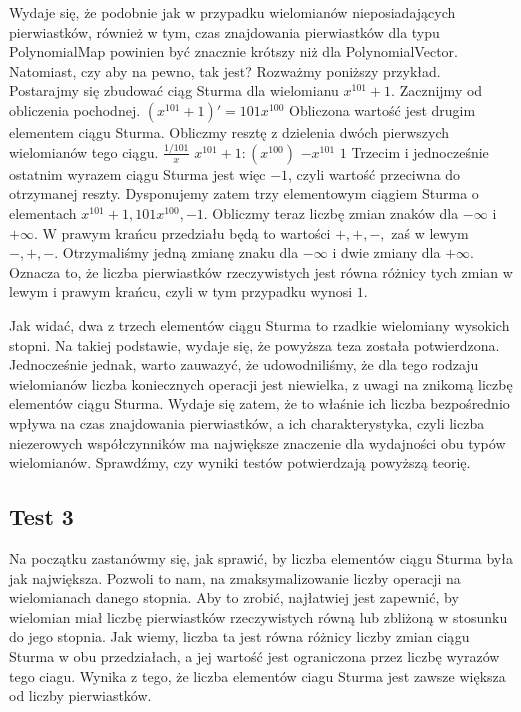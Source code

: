 \documentclass[oneside,a4paper]{book}
\begin{document}
	Wydaje się, że podobnie jak w przypadku wielomianów nieposiadających pierwiastków, również w tym, czas znajdowania pierwiastków dla typu PolynomialMap powinien być znacznie krótszy niż dla PolynomialVector. Natomiast, czy aby na pewno, tak jest? Rozważmy poniższy przykład.
	Postarajmy się zbudować ciąg Sturma dla wielomianu $x^{101}+1$. Zacznijmy od obliczenia pochodnej.
	$(x^{101}+1)'=101x^{100}$
	Obliczona wartość jest drugim elementem ciągu Sturma. Obliczmy resztę z dzielenia dwóch pierwszych wielomianów tego ciągu.
	$\frac{1/101}x$
	$x^{101}+1 : (x^{100})$
	$-x^{101}$
	$1$
	Trzecim i jednocześnie ostatnim wyrazem ciągu Sturma jest więc $-1$, czyli wartość przeciwna do otrzymanej reszty. Dysponujemy zatem trzy elementowym ciągiem Sturma o elementach ${x^{101}+1, 101x^{100}, -1}$. Obliczmy teraz liczbę zmian znaków dla $-\infty$ i $+\infty$. W prawym krańcu przedziału będą to wartości $+,+,-,$ zaś w lewym $-,+,-.$ Otrzymaliśmy jedną zmianę znaku dla $-\infty$ i dwie zmiany dla $+\infty$. Oznacza to, że liczba pierwiastków rzeczywistych jest równa różnicy tych zmian w lewym i prawym krańcu, czyli w tym przypadku wynosi $1$.
	
	Jak widać, dwa z trzech elementów ciągu Sturma to rzadkie wielomiany wysokich stopni. Na takiej podstawie, wydaje się, że powyższa teza została potwierdzona. Jednocześnie jednak, warto zauwazyć, że udowodniliśmy, że dla tego rodzaju wielomianów liczba koniecznych operacji jest niewielka, z uwagi na znikomą liczbę elementów ciągu Sturma. Wydaje się zatem, że to właśnie ich liczba bezpośrednio wpływa na czas znajdowania pierwiastków, a ich charakterystyka, czyli liczba niezerowych współczynników ma największe znaczenie dla wydajności obu typów wielomianów. Sprawdźmy, czy wyniki testów potwierdzają powyższą teorię.
	
	\subsection{Test 3}
	
	Na początku zastanówmy się, jak sprawić, by liczba elementów ciągu Sturma była jak największa. Pozwoli to nam, na zmaksymalizowanie liczby operacji na wielomianach danego stopnia. Aby to zrobić, najłatwiej jest zapewnić, by wielomian miał liczbę pierwiastków rzeczywistych równą lub zbliżoną w stosunku do jego stopnia. Jak wiemy, liczba ta jest równa różnicy liczby zmian ciągu Sturma w obu przedziałach, a jej wartość jest ograniczona przez liczbę wyrazów tego ciagu. Wynika z tego, że liczba elementów ciagu Sturma jest zawsze większa od liczby pierwiastków.
	
\end{document}

